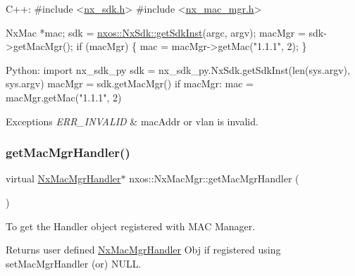 \begin{DoxyCode}
C++:
\textcolor{preprocessor}{     #include <\mbox{\hyperlink{nx__sdk_8h}{nx\_sdk.h}}>}
\textcolor{preprocessor}{     #include <\mbox{\hyperlink{nx__mac__mgr_8h}{nx\_mac\_mgr.h}}>}

     NxMac *mac;
     sdk = \mbox{\hyperlink{classnxos_1_1_nx_sdk_a5050e2d26c40744b4fc7862068a83f39}{nxos::NxSdk::getSdkInst}}(argc, argv);
     macMgr = sdk->getMacMgr();
     \textcolor{keywordflow}{if} (macMgr) \{
         mac = macMgr->getMac(\textcolor{stringliteral}{"1.1.1"}, 2);
     \}

Python:
     \textcolor{keyword}{import} nx\_sdk\_py
     sdk = nx\_sdk\_py.NxSdk.getSdkInst(len(sys.argv), sys.argv)
     macMgr = sdk.getMacMgr()
     \textcolor{keywordflow}{if} macMgr:
         mac = macMgr.getMac(\textcolor{stringliteral}{"1.1.1"}, 2)
\end{DoxyCode}



\begin{DoxyExceptions}{Exceptions}
{\em E\+R\+R\+\_\+\+I\+N\+V\+A\+L\+ID} & mac\+Addr or vlan is invalid. \\
\hline
\end{DoxyExceptions}
\mbox{\label{classnxos_1_1_nx_mac_mgr_a94e3fcb535f109501d319d72a24bdead}} 
\subsubsection{\texorpdfstring{get\+Mac\+Mgr\+Handler()}{getMacMgrHandler()}}
{\footnotesize\ttfamily virtual \mbox{\hyperlink{classnxos_1_1_nx_mac_mgr_handler}{Nx\+Mac\+Mgr\+Handler}}$\ast$ nxos\+::\+Nx\+Mac\+Mgr\+::get\+Mac\+Mgr\+Handler (\begin{DoxyParamCaption}{ }\end{DoxyParamCaption})\hspace{0.3cm}{\ttfamily [pure virtual]}}

To get the Handler object registered with M\+AC Manager.

\begin{DoxyReturn}{Returns}
user defined \mbox{\hyperlink{classnxos_1_1_nx_mac_mgr_handler}{Nx\+Mac\+Mgr\+Handler}} Obj if registered using set\+Mac\+Mgr\+Handler (or) N\+U\+LL. 
\end{DoxyReturn}
\mbox{\label{classnxos_1_1_nx_mac_mgr_a06f53bd41ddb17e6cfaef5a02b00415d}} 
